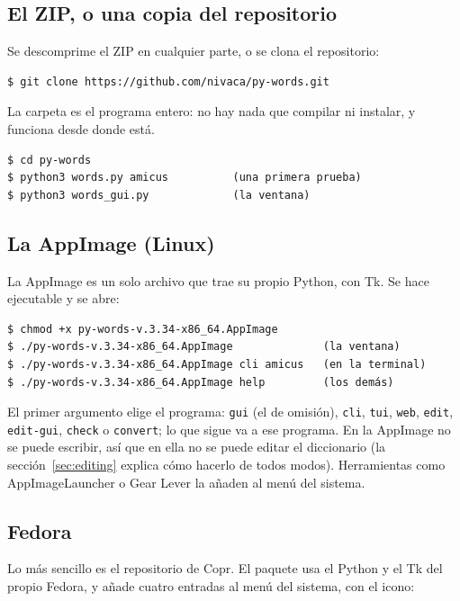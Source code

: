 \documentclass[12pt,
              article,
              oneside
              ]{memoir}
\begin{document}
\subsection{El ZIP, o una copia del repositorio}

%
Se descomprime el ZIP en cualquier parte, o se clona el repositorio:

\begin{verbatim}
$ git clone https://github.com/nivaca/py-words.git
\end{verbatim}

\noindent
La carpeta es el programa entero: no hay nada que compilar ni instalar, y
funciona desde donde está.

\begin{verbatim}
$ cd py-words
$ python3 words.py amicus          (una primera prueba)
$ python3 words_gui.py             (la ventana)
\end{verbatim}

\subsection{La AppImage (Linux)}

%
La AppImage es un solo archivo que trae su propio Python, con Tk. Se hace
ejecutable y se abre:

\begin{verbatim}
$ chmod +x py-words-v.3.34-x86_64.AppImage
$ ./py-words-v.3.34-x86_64.AppImage              (la ventana)
$ ./py-words-v.3.34-x86_64.AppImage cli amicus   (en la terminal)
$ ./py-words-v.3.34-x86_64.AppImage help         (los demás)
\end{verbatim}

\noindent{}%
El primer argumento elige el programa: \texttt{gui} (el de omisión),
\texttt{cli}, \texttt{tui}, \texttt{web}, \texttt{edit},
\texttt{edit-gui}, \texttt{check} o \texttt{convert}; lo que sigue va a
ese programa. En la AppImage no se puede escribir, así que en ella no se
puede editar el diccionario (la sección~\ref{sec:editing} explica cómo
hacerlo de todos modos). Herramientas como AppImageLauncher o Gear Lever
la añaden al menú del sistema.

\subsection{Fedora}

%
Lo más sencillo es el repositorio de Copr. El paquete usa el Python y el
Tk del propio Fedora, y añade cuatro entradas al menú del sistema, con el
icono:
\end{document}

